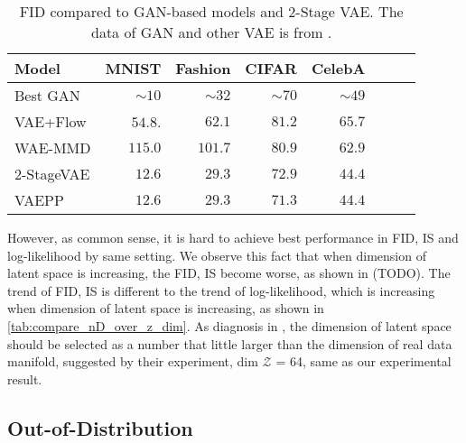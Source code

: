 \begin{table}[tb]
\centering
\begin{tabular}{lrrrrrrr}  
\toprule
Model & MNIST & Fashion & CIFAR & CelebA\\
\midrule
Best GAN   & $\sim10$& $\sim32$&$\sim70$& $\sim49$\\
VAE+Flow   & $54.8$. & $62.1$  & $81.2$ & $65.7$\\
WAE-MMD    & $115.0$ & $101.7$ & $80.9$ & $62.9$\\
2-StageVAE & $12.6$  & $29.3$  & $72.9$ & $44.4$\\
VAEPP      & $12.6$  & $29.3$  & $71.3$ & $44.4$ \\
\bottomrule
\end{tabular}
\caption{FID compared to GAN-based models and 2-Stage VAE. The data of GAN and other VAE is from \protect\cite{dai2019diagnosing}. }
\label{tab:compare_FID}
\end{table}

However, as common sense, it is hard to achieve best performance in FID, IS and log-likelihood by same setting. We observe this fact that when dimension of latent space is increasing, the FID, IS become worse, as shown in (TODO). The trend of FID, IS is different to the trend of log-likelihood, which is increasing when dimension of latent space is increasing, as shown in \cref{tab:compare_nD_over_z_dim}. As diagnosis in \cite{dai2019diagnosing}, the dimension of latent space should be selected as a number that little larger than the dimension of real data manifold, suggested by their experiment, dim $\mathcal{Z}$ = 64, same as our experimental result.  

\subsection{Out-of-Distribution}

